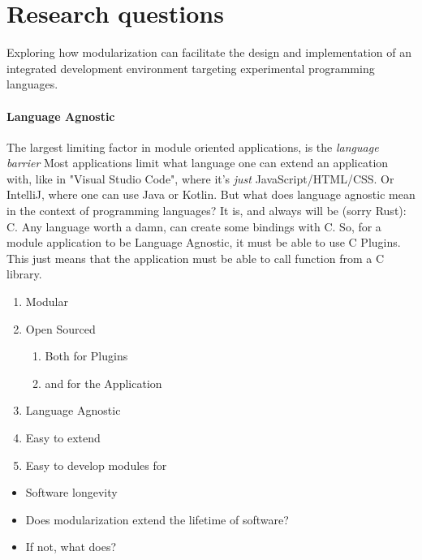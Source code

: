 \section{Research questions}

Exploring how modularization can facilitate the design and implementation of
an integrated development environment targeting experimental programming
languages.




\paragraph{Language Agnostic} The largest limiting factor in module oriented
applications, is the \textit{language barrier} Most applications limit what
language one can extend an application with, like in "Visual Studio Code", where
it's \textit{just} JavaScript/HTML/CSS. Or IntelliJ, where one can use Java or
Kotlin. But what does language agnostic mean in the context of programming
languages? It is, and always will be (sorry Rust): C. Any language worth a damn,
can create some bindings with C. So, for a module application to be Language
Agnostic, it must be able to use C Plugins. This just means that the application
must be able to call function from a C library.

\begin{enumerate}
  \item Modular
  \item Open Sourced
    \begin{enumerate}
      \item Both for Plugins
      \item and for the Application
    \end{enumerate}
  \item Language Agnostic
  \item Easy to extend
  \item Easy to develop modules for
\end{enumerate}

\begin{itemize}
  \item Software longevity
  \item Does modularization extend the lifetime of software?
  \item If not, what does?
\end{itemize}
